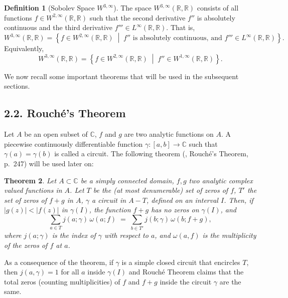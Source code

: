 \documentclass[12pt,letterpaper]{amsart}
\newtheorem{theorem}{Theorem}[section]
\theoremstyle{definition}
\newtheorem{definition}[theorem]{Definition}
\theoremstyle{remark}
\numberwithin{equation}{section}
\begin{document}
\begin{definition}[Sobolev Space $ W^{3,\infty} $]
The space $ W^{3,\infty}(\mathbb{R}, \mathbb{R}) $ consists of all functions $ f \in W^{2,\infty}(\mathbb{R}, \mathbb{R}) $ such that the second derivative $ f'' $ is absolutely continuous and the third derivative $ f''' \in L^\infty(\mathbb{R}, \mathbb{R}) $. That is,
$$
W^{3,\infty}(\mathbb{R}, \mathbb{R}) =
\left\{
f \in W^{2,\infty}(\mathbb{R}, \mathbb{R})
\;\middle|\;
f'' \text{ is absolutely continuous, and } f''' \in L^\infty(\mathbb{R}, \mathbb{R})
\right\}.
$$
Equivalently,
$$
W^{3,\infty}(\mathbb{R}, \mathbb{R}) =
\left\{ f \in W^{2,\infty}(\mathbb{R}, \mathbb{R}) \;\middle|\; f'' \in W^{1,\infty}(\mathbb{R}, \mathbb{R}) \right\}.
$$
\end{definition} 
 
 
 We now recall some important theorems that will be used in the subsequent sections.
 \subsection*{2.2. Rouché's Theorem}
 Let $A$ be an open subset of $\mathbb{C}$, $f$ and $g$ are two analytic functions on $A$. 
 A piecewise continuously differentiable function $\gamma : [a,b] \to \mathbb{C}$ such that 
 $\gamma(a) = \gamma(b)$ is called a circuit. The following theorem (\cite{7}, Rouché's Theorem, p.~247) 
 will be used later on:
 
 \begin{theorem} \label{Rouche}
 	Let $A \subset \mathbb{C}$ be a simply connected domain, $f, g$ two analytic complex valued 
 	functions in $A$. Let $T$ be the (at most denumerable) set of zeros of $f$, 
 	$T'$ the set of zeros of $f+g$ in $A$, $\gamma$ a circuit in $A - T$, defined on an interval $I$. 
 	Then, if $|g(z)| < |f(z)|$ in $\gamma(I)$, the function $f+g$ has no zeros on $\gamma(I)$, and
 	\begin{equation}\label{2.1}
 		\sum_{a \in T} j(a;\gamma)\,\omega(a;f) \;=\; 
 		\sum_{b \in T'} j(b;\gamma)\,\omega(b; f+g),
 	\end{equation}
 	where $j(a;\gamma)$ is the index of $\gamma$ with respect to $a$, and $\omega(a,f)$ is the multiplicity 
 	of the zeros of $f$ at $a$.
 \end{theorem}
 
 As a consequence of the theorem, if $\gamma$ is a simple closed circuit that encircles $T$, then 
 $j(a,\gamma)=1$ for all $a$ inside $\gamma(I)$ and Rouché Theorem claims that the total zeros 
 (counting multiplicities) of $f$ and $f+g$ inside the circuit $\gamma$ are the same.
 
\end{document}
